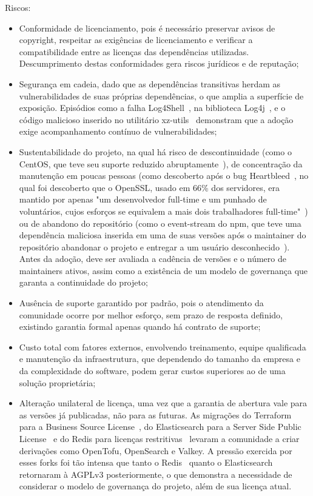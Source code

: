 Riscos:
\begin{itemize}
	\item Conformidade de licenciamento, pois é necessário preservar avisos de copyright, respeitar as exigências de licenciamento e verificar a compatibilidade entre as licenças das dependências utilizadas. Descumprimento destas conformidades gera riscos jurídicos e de reputação;
	\item Segurança em cadeia, dado que as dependências transitivas herdam as vulnerabilidades de suas próprias dependências, o que amplia a superfície de exposição. Episódios como a falha Log4Shell~\cite{ibm2024log4shell}, na biblioteca Log4j~\cite{ibm2024log4j}, e o código malicioso inserido no utilitário xz-utils~\cite{wikipedia2026xzbackdoor} demonstram que a adoção exige acompanhamento contínuo de vulnerabilidades;
	\item Sustentabilidade do projeto, na qual há risco de descontinuidade (como o CentOS, que teve seu suporte reduzido abruptamente~\cite{centosSupport}), de concentração da manutenção em poucas pessoas (como descoberto após o bug Heartbleed~\cite{heartbleed}, no qual foi descoberto que o OpenSSL, usado em 66\% dos servidores, era mantido por apenas "um desenvolvedor full-time e um punhado de voluntários, cujos esforços se equivalem a mais dois trabalhadores full-time"~\cite{opensslDonations}) ou de abandono do repositório (como o event-stream do npm, que teve uma dependência maliciosa inserida em uma de suas versões após o maintainer do repositório abandonar o projeto e entregar a um usuário desconhecido~\cite{npmEventStream}). Antes da adoção, deve ser avaliada a cadência de versões e o número de maintainers ativos, assim como a existência de um modelo de governança que garanta a continuidade do projeto;
	\item Ausência de suporte garantido por padrão, pois o atendimento da comunidade ocorre por melhor esforço, sem prazo de resposta definido, existindo garantia formal apenas quando há contrato de suporte;
	\item Custo total com fatores externos, envolvendo treinamento, equipe qualificada e manutenção da infraestrutura, que dependendo do tamanho da empresa e da complexidade do software, podem gerar custos superiores ao de uma solução proprietária;
	\item Alteração unilateral de licença, uma vez que a garantia de abertura vale para as versões já publicadas, não para as futuras. As migrações do Terraform para a Business Source License~\cite{terraformLicence}, do Elasticsearch para a Server Side Public License~\cite{elasticsearchLicense} e do Redis para licenças restritivas~\cite{redisLicense} levaram a comunidade a criar derivações como OpenTofu, OpenSearch e Valkey. A pressão exercida por esses forks foi tão intensa que tanto o Redis~\cite{redisAgplv3} quanto o Elasticsearch~\cite{elasticsearchAgplv3} retornaram à AGPLv3 posteriormente, o que demonstra a necessidade de considerar o modelo de governança do projeto, além de sua licença atual.
\end{itemize}